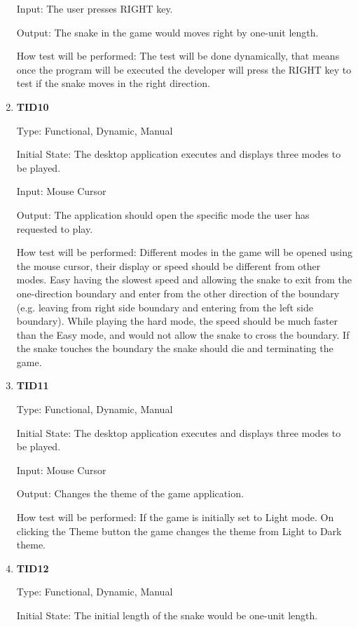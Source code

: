 \documentclass[12pt, titlepage]{article}
\begin{document}
\begin{enumerate}
Input: The user presses RIGHT key.
					
Output: The snake in the game would moves right by one-unit length.
					
How test will be performed: The test will be done dynamically, that means once the program will be executed the developer will press the RIGHT key to test if the snake moves in the right direction.

\item{\textbf{TID10}\\}

Type: Functional, Dynamic, Manual 	
					
Initial State: The desktop application executes and displays three modes to be played.	
				
Input: Mouse Cursor

Output: The application should open the specific mode the user has requested to play.
					
How test will be performed: Different modes in the game will be opened using the mouse cursor, their display or speed should be different from other modes. Easy having the slowest speed and allowing the snake to exit from the one-direction boundary and enter from the other direction of the boundary (e.g. leaving from right side boundary and entering from the left side boundary). While playing the hard mode, the speed should be much faster than the Easy mode, and would not allow the snake to cross the boundary. If the snake touches the boundary the snake should die and terminating the game.

\item{\textbf{TID11}\\}

Type: Functional, Dynamic, Manual 	
					
Initial State: The desktop application executes and displays three modes to be played.	
				
Input: Mouse Cursor

Output: Changes the theme of the game application.
					
How test will be performed: If the game is initially set to Light mode. On clicking the Theme button the game changes the theme from Light to Dark theme.

\item{\textbf{TID12}\\}

Type: Functional, Dynamic, Manual 	
					
Initial State: The initial length of the snake would be one-unit length.
				

\end{enumerate}
\end{document}
